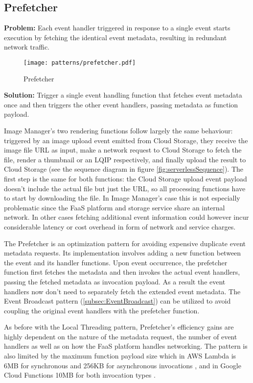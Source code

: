 \subsection{Prefetcher} \label{subsec:prefetcher}

\textbf{Problem:} Each event handler triggered in response to a single event starts execution by fetching the identical event metadata, resulting in redundant network traffic.

\begin{figure}[h]
  \centering
  \texttt{[image: patterns/prefetcher.pdf]}
  \caption{Prefetcher}
  \label{fig:prefetcher}
\end{figure}

\textbf{Solution:} Trigger a single event handling function that fetches event metadata once and then triggers the other event handlers, passing metadata as function payload.

Image Manager's two rendering functions follow largely the same behaviour: triggered by an image upload event emitted from Cloud Storage, they receive the image file URL as input, make a network request to Cloud Storage to fetch the file, render a thumbnail or an LQIP respectively, and finally upload the result to Cloud Storage (see the sequence diagram in figure \ref{fig:serverlessSequence}). The first step is the same for both functions: the Cloud Storage upload event payload doesn't include the actual file but just the URL, so all processing functions have to start by downloading the file. In Image Manager's case this is not especially problematic since the FaaS platform and storage service share an internal network. In other cases fetching additional event information could however incur considerable latency or cost overhead in form of network and service charges.

The Prefetcher is an optimization pattern for avoiding expensive duplicate event metadata requests. Its implementation involves adding a new function between the event and its handler functions. Upon event occurrence, the prefetcher function first fetches the metadata and then invokes the actual event handlers, passing the fetched metadata as invocation payload. As a result the event handlers now don't need to separately fetch the extended event metadata. The Event Broadcast pattern (\ref{subsec:EventBroadcast}) can be utilized to avoid coupling the original event handlers with the prefetcher function.

As before with the Local Threading pattern, Prefetcher's efficiency gains are highly dependent on the nature of the metadata request, the number of event handlers as well as on how the FaaS platform handles networking. The pattern is also limited by the maximum function payload size which in AWS Lambda is 6MB for synchronous and 256KB for asynchronous invocations \parencite{awslambda0218}, and in Google Cloud Functions 10MB for both invocation types \parencite{google18cloudFunctions}.

